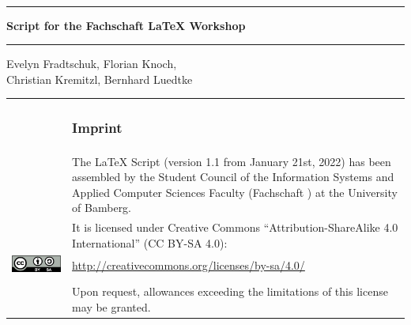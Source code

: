 \thispagestyle{empty}
\begin{center}
	\fslogo \\
	\vspace{3em}
	\rule{\textwidth}{1pt}\par
	\vspace{0.8\baselineskip}
			\Huge\bfseries Script for the Fachschaft  \LaTeX{} Workshop
	\rule{\textwidth}{1pt}\par
	\vfill
	\vfill
	{\Large{ Evelyn Fradtschuk, Florian Knoch,\\
	Christian Kremitzl, Bernhard Luedtke}}\\		
	\vfill
\end{center}

\newpage
\thispagestyle{empty}

\mbox{}
\vfill

\begin{tabular}{@{}lp{9cm}}
	& \subsubsection*{Imprint} \\
	& The \LaTeX{} Script (version 1.1 from January 21st, 2022) has been assembled by the Student Council of the Information Systems and Applied Computer Sciences Faculty (Fachschaft \acro{WIAI}) at the University of Bamberg. \\
	& It is licensed under Creative Commons \enquote{Attribution-ShareAlike 4.0 International} (CC BY-SA 4.0): \\
	\href{http://creativecommons.org/licenses/by-sa/4.0/}{\includegraphics[height=.5cm]{graphics/cc-by-sa}} & \url{http://creativecommons.org/licenses/by-sa/4.0/} \\ \\
	& Upon request, allowances exceeding the limitations of this license may be granted.
\end{tabular}
